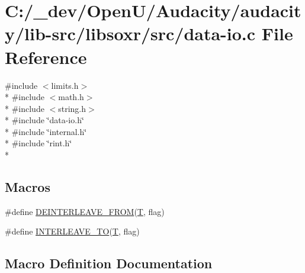 \hypertarget{data-io_8c}{}\section{C\+:/\+\_\+dev/\+Open\+U/\+Audacity/audacity/lib-\/src/libsoxr/src/data-\/io.c File Reference}
\label{data-io_8c}
{\ttfamily \#include $<$limits.\+h$>$}\\*
{\ttfamily \#include $<$math.\+h$>$}\\*
{\ttfamily \#include $<$string.\+h$>$}\\*
{\ttfamily \#include \char`\"{}data-\/io.\+h\char`\"{}}\\*
{\ttfamily \#include \char`\"{}internal.\+h\char`\"{}}\\*
{\ttfamily \#include \char`\"{}rint.\+h\char`\"{}}\\*
\subsection*{Macros}
\begin{DoxyCompactItemize}
\item 
\#define \hyperlink{data-io_8c_ae6d89d1b1d2e8f0662f218b8e7acc5e8}{D\+E\+I\+N\+T\+E\+R\+L\+E\+A\+V\+E\+\_\+\+F\+R\+OM}(\hyperlink{xmltchar_8h_a16a0f7e7053a679c9bf4289b441a2be7}{T},  flag)
\item 
\#define \hyperlink{data-io_8c_a204b77de8b9fc7684b3c3faa933e8149}{I\+N\+T\+E\+R\+L\+E\+A\+V\+E\+\_\+\+TO}(\hyperlink{xmltchar_8h_a16a0f7e7053a679c9bf4289b441a2be7}{T},  flag)
\end{DoxyCompactItemize}


\subsection{Macro Definition Documentation}
